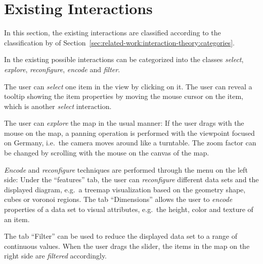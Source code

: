 \section{Existing Interactions}
In this section, the existing interactions are classified according to the classification by \textcite{Yi2007} of Section~\ref{sec:related-work:interaction-theory:categories}.

In the existing \visan{} possible interactions can be categorized into the classes \emph{select}, \emph{explore}, \emph{reconfigure}, \emph{encode} and \emph{filter}.

The user can \emph{select} one item in the view by clicking on it.
The user can reveal a tooltip showing the item properties by moving the mouse cursor on the item, which is another \emph{select} interaction.

The user can \emph{explore} the map in the usual manner:
If the user drags with the mouse on the map, a panning operation is performed with the viewpoint focused on Germany, i.e.\ the camera moves around like a turntable.
The zoom factor can be changed by scrolling with the mouse on the canvas of the map.

\emph{Encode} and \emph{reconfigure} techniques are performed through the menu on the left side:
Under the ``features'' tab, the user can \emph{reconfigure} different data sets and the displayed diagram, e.g.\ a treemap visualization based on the geometry shape, cubes or voronoi regions.
The tab ``Dimensions'' allows the user to \emph{encode} properties of a data set to visual attributes, e.g.\ the height, color and texture of an item.

The tab ``Filter'' can be used to reduce the displayed data set to a range of continuous values.
When the user drags the slider, the items in the map on the right side are \emph{filtered} accordingly.


